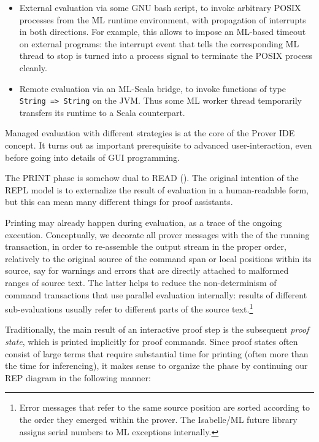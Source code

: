 \begin{isabellebody}
\begin{isamarkuptext}
\begin{itemize}
\begin{itemize}
  \end{itemize}

  \item External evaluation via some GNU bash script, to invoke
  arbitrary POSIX processes from the ML runtime environment, with
  propagation of interrupts in both directions.  For example, this
  allows to impose an ML-based timeout on external programs: the
  interrupt event that tells the corresponding ML thread to stop is
  turned into a process signal to terminate the POSIX process cleanly.

  \item Remote evaluation via an ML-Scala bridge, to invoke functions
  of type \verb|String => String| on the JVM.  Thus some ML
  worker thread temporarily transfers its runtime to a Scala
  counterpart.

  \end{itemize}

  Managed evaluation with different strategies is at the core of the
  Prover IDE concept.  It turns out as important prerequisite to
  advanced user-interaction, even before going into details
  of GUI programming.%
\end{isamarkuptext}%
\isamarkuptrue%
%
\isamarkuptrue%
%
\begin{isamarkuptext}%
The PRINT phase is somehow dual to READ ().
  The original intention of the REPL model is to externalize the
  result of evaluation in a human-readable form, but this can mean
  many different things for proof assistants.

  Printing may already happen during evaluation, as a trace of the
  ongoing execution.  Conceptually, we decorate all prover messages
  with the  of the running transaction, in order to
  re-assemble the output stream in the proper order, relatively to the
  original source of the command span or local positions within its
  source, say for warnings and errors that are directly attached to
  malformed ranges of source text.  The latter helps to reduce the
  non-determinism of command transactions that use parallel evaluation
  internally: results of different sub-evaluations usually refer to
  different parts of the source text.\footnote{Error messages that
  refer to the same source position are sorted according to the order
  they emerged within the prover.  The Isabelle/ML future library
  assigns serial numbers to ML exceptions internally.}

  Traditionally, the main result of an interactive proof step is the
  subsequent \emph{proof state}, which is printed implicitly for proof
  commands.  Since proof states often consist of large terms that
  require substantial time for printing (often more than the time for
  inferencing), it makes sense to organize the  phase by
  continuing our REP diagram in the following manner:


\end{isamarkuptext}
\end{isabellebody}
